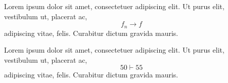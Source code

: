 \documentclass[a4paper,12pt]{article}
\begin{document}
Lorem ipsum dolor sit amet, consectetuer adipiscing elit. Ut purus elit, vestibulum ut, placerat ac, 
\begin{displaymath}
	f_{n} \rightarrow f
\end{displaymath}
adipiscing vitae, felis. Curabitur dictum gravida mauris.


Lorem ipsum dolor sit amet, consectetuer adipiscing elit. Ut purus elit, vestibulum ut, placerat ac, 
\begin{displaymath}
	50 \vdash 55
\end{displaymath}
adipiscing vitae, felis. Curabitur dictum gravida mauris.
\end{document}
